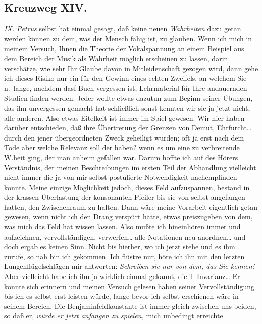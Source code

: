 \documentclass[
]{article}
\author{}
\date{\vspace{-2.5em}}
\begin{document}
\subsection{Kreuzweg XIV.}\label{kreuzweg-xiv.}

\emph{IX. Petrus} selbst hat einmal gesagt, daß keine neuen
\emph{Wahrheiten }dazu getan werden können zu dem, was der Mensch fähig
ist, zu glauben. Wenn ich mich in meinem Versuch, Ihnen die Theorie der
Vokalspannung an einem Beispiel aus dem Bereich der Musik als Wahrheit
möglich erscheinen zu lassen, darin verschätze, wie sehr Ihr Glaube
davon in Mitleidenschaft gezogen wird, dann gehe ich dieses Risiko nur
ein für den Gewinn eines echten Zweifels, an welchem Sie n.~lange,
nachdem dasf Buch vergessen ist, Lehrmaterial für Ihre andauernden
Studien finden werden. Jeder wollte etwas dazutun zum Beginn seiner
Übungen, das ihn unvergessen gemacht hat schließlich sonst kennten wir
sie ja jetzt nicht, alle anderen. Also etwas Eitelkeit ist immer im
Spiel gewesen. Wir hier haben darüber entschieden, daß ihre Übertretung
der Grenzen von Demut, Ehrfurcht\ldots{} durch den jener übergeordneten
Zweck geheiligt wurden; oft ja erst nach dem Tode aber welche Relevanz
soll der haben? wenn es um eine zu verbreitende W.heit ging, der man
anheim gefallen war. Darum hoffte ich auf des Hörers Verständnis, der
meinen Beschreibungen im ersten Teil der Abhandlung vielleicht nicht
immer die ja von mir selbst postulierte Notwendigkeit nachempfinden
konnte. Meine einzige Möglichkeit jedoch, dieses Feld aufzuspannen,
bestand in der krassen Überlastung der konsonanten Pfeiler bis sie von
selbst angefangen hatten, den Zwischenraum zu halten. Dann wäre meine
Vorarbeit eigentlich getan gewesen, wenn nicht ich den Drang verspürt
hätte, etwas preiszugeben von dem, was mich das Feld hat wissen lassen.
Also mußte ich hineinhören immer und aufzeichnen, vervollständigen,
verwerfen\ldots{} alle Notationen neu anordnen\ldots{} und doch ergab es
keinen Sinn. Nicht bis hierher, wo ich jetzt stehe und es ihm zurufe, so
nah bin ich gekommen. Ich flüstre nur, höre ich ihn mit den letzten
Lungenflügelschlägen mir antworten: \emph{Schreiben sie nur von dem, das
Sie kennen!} Aber vielleicht habe ich ihn ja wirklich einmal gekannt,
die T-Invarianz\ldots{} Er könnte sich erinnern und meinen Versuch
gelesen haben seiner Vervollständigung bis ich es selbst erst leisten
würde, lange bevor ich selbst erschienen wäre in seinem Bereich. Die
Benjaminfeldkonstante ist immer gleich zwischen uns beiden, so daß er,
\emph{würde er jetzt anfangen zu spielen,} mich unbedingt erreichte.\\
\end{document}
